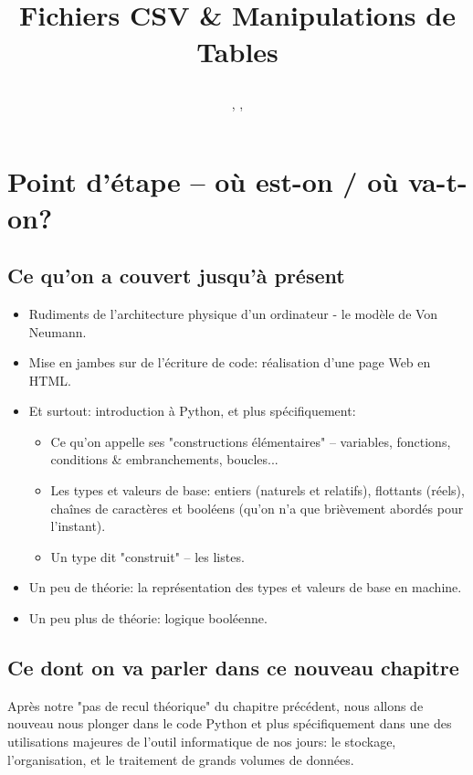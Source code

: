 \documentclass[12pt]{article}
\title
	{\vspace{3cm}
		{\Large
		\textit
			{
				\classe\hspace{0.1cm}
				\textemdash\
				\hspace{0.1cm}
				\themecours
			}
			
		\vspace{1cm}
		\huge{Fichiers CSV \& Manipulations de Tables} }
		 
		\vspace{1cm}
	}
\author{\etablissement}
\date{
	\auteur,
	\datedoc,
	\footnotesize{\textit{\versiondoc}} 
	\vspace{6cm}
	}
\begin{document}
	
	\maketitle
	\thispagestyle{empty}
		
	\section*{}
		{\noindent
		\resumecours
		}
		
	\pagebreak	
	\tableofcontents
	
	\pagebreak
	
	\section{Point d'étape -- où est-on / où va-t-on?}
	\subsection{Ce qu'on a couvert jusqu'à présent}
	
	\begin{itemize}
		\item Rudiments de l'architecture physique d'un ordinateur - le modèle de Von Neumann.
		\item Mise en jambes sur de l'écriture de code: réalisation d'une page Web en HTML.
		\item Et surtout: introduction à Python, et plus spécifiquement:
		\begin{itemize}
			\item Ce qu'on appelle ses "constructions élémentaires" -- variables, fonctions, conditions \& embranchements, boucles...
			\item Les types et valeurs de base: entiers (naturels et relatifs), flottants (réels), chaînes de caractères et booléens (qu'on n'a que brièvement abordés pour l'instant).
			\item Un type dit "construit" -- les listes.
		\end{itemize}
		\item Un peu de théorie: la représentation des types et valeurs de base en machine.
		\item Un peu plus de théorie: logique booléenne.
	\end{itemize}
	
	\subsection{Ce dont on va parler dans ce nouveau chapitre}
	Après notre "pas de recul théorique" du chapitre précédent, nous allons de nouveau nous plonger dans le code Python et plus spécifiquement dans une des utilisations majeures de l'outil informatique de nos jours: le stockage, l'organisation, et le traitement de grands volumes de données.
	
\end{document}
